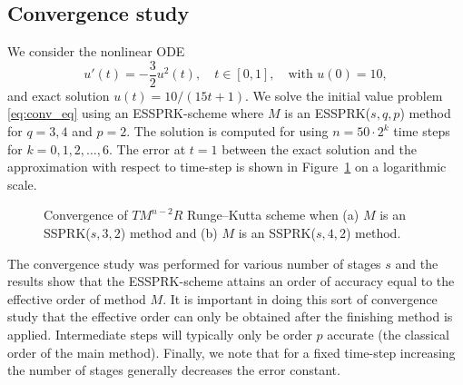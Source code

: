 \subsection{Convergence study}\label{subsec:convergence}
We consider the nonlinear ODE
\begin{equation}\label{eq:conv_eq}
    u'(t) = -\frac{3}{2}u^{2}(t), \quad t \in [0,1], \quad \text{with } u(0) = 10,
\end{equation}
and exact solution $u(t) = 10/(15t + 1)$.
We solve the initial value problem \eqref{eq:conv_eq}
using an ESSPRK-scheme where $M$ is an 
ESSPRK($s,q,p$) method for $q = 3, 4$ and $p = 2$.
The solution is computed for using $n = 50 \cdot 2^{k}$ time steps for
$k = 0, 1, 2, \dots, 6$.
The error at $t=1$ between the exact solution and the approximation with respect 
to time-step is shown in Figure~\ref{fig:conv_study} on a logarithmic scale.
\begin{figure}
	\centering
   \quad
    \caption{Convergence of $TM^{n-2}R$ Runge--Kutta scheme when (a) $M$
    is an SSPRK($s,3,2$) method and (b) $ M $ is an SSPRK($s,4,2$) method.}
    \label{fig:conv_study}
\end{figure}
The convergence study was performed for various number of stages $s$ and the results 
show that the ESSPRK-scheme attains an order of accuracy equal to the effective order of 
method $M$.
It is important in doing this sort of convergence study that the
effective order can only be obtained after the finishing method is
applied.
Intermediate steps will typically only be order $p$ accurate (the classical
order of the main method).
Finally, we note that for a fixed time-step increasing the number of stages
generally decreases the error constant.

